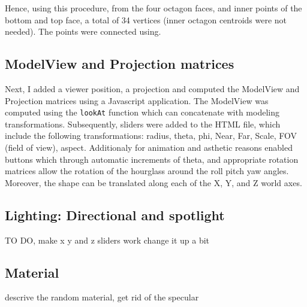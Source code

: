 \documentclass[12pt,a4paper]{article}
\begin{document}
Hence, using this procedure, from the four octagon faces, and inner points of the bottom and top face, a total of 34 vertices  (inner octagon centroids were not needed). The points were connected using.

\subsection{ModelView and Projection matrices}

Next, I added a viewer position, a projection and computed the ModelView and Projection matrices using a Javascript application. The ModelView was computed using the \texttt{lookAt} function which can concatenate with modeling transformations. Subsequently, sliders were added to the HTML file, which include the following transformations: radius, theta, phi, Near, Far, Scale, FOV (field of view), aspect. Additionaly for animation and asthetic reasons enabled buttons which through automatic increments of theta, and appropriate rotation matrices allow the rotation of the hourglass around the roll pitch yaw angles. Moreover, the shape can be translated along each of the X, Y, and Z world axes.

\subsection{Lighting: Directional and spotlight}
TO DO, make x y and z sliders work
change it up a bit
\subsection{Material}
descrive the random material, get rid of the specular
\clearpage
\end{document}
